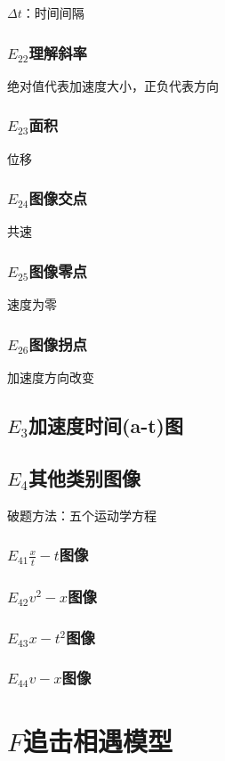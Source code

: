 \documentclass[lang=cn,10pt]{elegantbook}
\begin{document}
	$\Delta t$：时间间隔
	\subsubsection{$E_{22}$理解斜率}
		绝对值代表加速度大小，正负代表方向
	\subsubsection{$E_{23}$面积}
	位移
	\subsubsection{$E_{24}$图像交点}
	共速
	\subsubsection{$E_{25}$图像零点}
	速度为零
	\subsubsection{$E_{26}$图像拐点}
	加速度方向改变
	\subsection{$E_3$加速度时间(a-t)图}
	\subsection{$E_4$其他类别图像}
	破题方法：五个运动学方程
	\subsubsection{$E_{41}$$\frac{x}{t}-t$图像}
	\vspace{2cm}
	\subsubsection{$E_{42}$$v^{2}-x$图像}
	\vspace{2cm}
	\subsubsection{$E_{43}$$x-t^{2}$图像}
	\vspace{2cm}
	\subsubsection{$E_{44}$$v-x$图像}
	\vspace{2cm}
	\section{$F$追击相遇模型}
\end{document}
